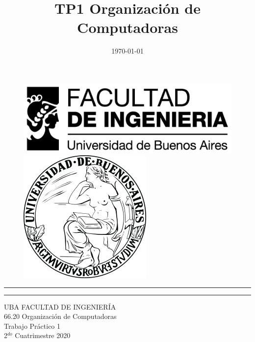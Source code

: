 \documentclass[11pt,a4paper]{article}
\begin{document}
\title{TP1 Organización de Computadoras}
\date{\today}

\begin{titlepage}
	
	\begin{figure}[H]
		\raggedright
		\includegraphics[scale=0.25]{logo_fiuba2.jpg}
		\hfill
		\raggedleft
		\includegraphics[scale=0.2]{logo_uba.png}
	\end{figure}
	\rule{\textwidth}{1pt}\par %
	\vspace{2pt}\vspace{-\baselineskip} %
	\rule{\textwidth}{0.4pt}\par %
	
	\vspace{0.05\textheight} %
	\centering %
	{\Huge UBA FACULTAD DE INGENIERÍA}\\[0.5\baselineskip]
	{\Large 66.20 Organización de Computadoras}\\[0.5\baselineskip]
	{\Huge Trabajo Práctico 1}\\[0.75\baselineskip]
	{\Large 2$^{do}$ Cuatrimestre 2020}\\[0.5\baselineskip]
	\vspace{0.2\textheight}



\end{titlepage}
\end{document}
